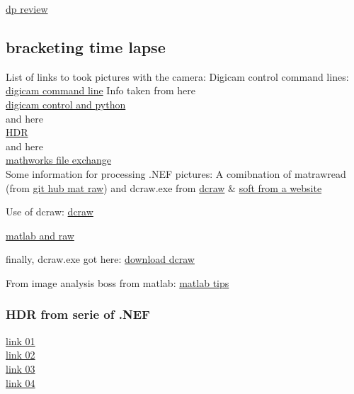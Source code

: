 \documentclass[lineno]{jfm}
\begin{document}
\href{https://www.dpreview.com/articles/9828658229/computational-photography-part-i-what-is-computational-photography/2}{dp review}

\subsection{bracketing time lapse}

List of links to took pictures with the camera:
Digicam control command lines: \href{http://digicamcontrol.com/doc/userguide/cmd }{digicam command line}
Info taken from here\\ \href{https://stackoverflow.com/questions/43358257/using-digicamcontrol-to-control-nikon-camera-using-python}{digicam control and python} \\ 
and here \\
\href{http://www.pauldebevec.com/Research/HDR/}{HDR}  \\
and here\\
\href{https://fr.mathworks.com/matlabcentral/fileexchange/57196-cameracontroller?s_tid=FX_rc3_behav}{mathworks file exchange} \\

Some information for processing .NEF pictures:
A comibnation of matrawread (from \href{https://github.com/QiuJueqin/MatRaw}{git hub mat raw}) and dcraw.exe from \href{https://www.dechifro.org/dcraw/}{dcraw}
$\&$ \href{https://www.fastpictureviewer.com/downloads/#links}{soft from a website}

Use of dcraw: \href{https://www.programmersought.com/article/46784093292/}{dcraw}

\href{https://www.cnba.it/contenuti/uploads/2016/03/Processing-RAW-Images-in-MATLAB-Sumner.pdf}{matlab and raw}

finally, dcraw.exe got here: \href{https://fr.osdn.net/projects/sfnet_dcrawnet/downloads/dcraw.exe/}{download dcraw}

From image analysis boss from matlab:
\href{https://blogs.mathworks.com/steve/2011/03/08/tips-for-reading-a-camera-raw-file-into-matlab/}{matlab tips}


\subsubsection{HDR from serie of .NEF}

\noindent \href{https://pypi.org/project/rawhdr/}{link 01}\\
\noindent \href{https://github.com/fthaler/rawhdr}{link 02}\\
\noindent \href{https://learnopencv.com/high-dynamic-range-hdr-imaging-using-opencv-cpp-python/}{link 03}\\
\noindent \href{https://stackoverflow.com/questions/30010227/how-could-i-get-the-raw-pixel-data-out-of-a-nef-file-using-python}{link 04}\\
\end{document}
